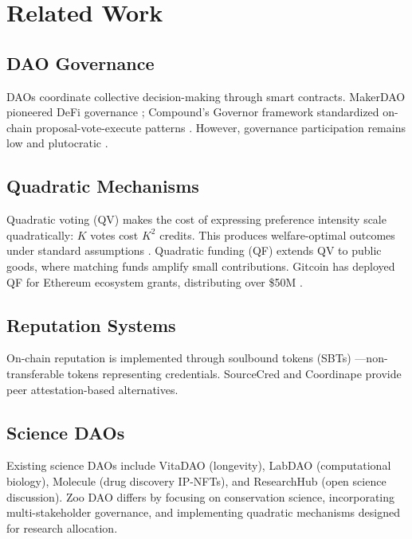 \section{Related Work}

\label{sec:related}

\subsection{DAO Governance}

DAOs coordinate collective decision-making through smart contracts.
MakerDAO pioneered DeFi governance \citep{mcdao2017}; Compound's
Governor framework standardized on-chain proposal-vote-execute patterns
\citep{compound2020governance}. However, governance participation remains
low and plutocratic \citep{barbereau2022defi}.

\subsection{Quadratic Mechanisms}

Quadratic voting (QV) \citep{lalley2018quadratic} makes the cost of
expressing preference intensity scale quadratically: $K$ votes cost
$K^2$ credits. This produces welfare-optimal outcomes under standard
assumptions \citep{posner2018radical}. Quadratic funding (QF)
\citep{buterin2019flexible} extends QV to public goods, where matching
funds amplify small contributions. Gitcoin has deployed QF for Ethereum
ecosystem grants, distributing over \$50M \citep{gitcoin2023}.

\subsection{Reputation Systems}

On-chain reputation is implemented through soulbound tokens (SBTs)
\citep{weyl2022decentralized}---non-transferable tokens representing
credentials. SourceCred \citep{sourcecred2020} and Coordinape
\citep{coordinape2021} provide peer attestation-based alternatives.

\subsection{Science DAOs}

Existing science DAOs include VitaDAO (longevity), LabDAO (computational
biology), Molecule (drug discovery IP-NFTs), and ResearchHub (open science
discussion). Zoo DAO differs by focusing on conservation science,
incorporating multi-stakeholder governance, and implementing quadratic
mechanisms designed for research allocation.



